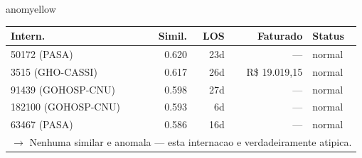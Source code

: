 \documentclass[a4paper,10pt]{article}
\begin{document}
\begin{anomalycard}[Internacao 124207 | GHO-PETROBRAS | MODERADO (z=2.03)]{anomyellow}
\begin{tabular}{l r r r l}\toprule\textbf{Intern.} & \textbf{Simil.} & \textbf{LOS} & \textbf{Faturado} & \textbf{Status} \\\midrule
50172 (PASA) & 0.620 & 23d & --- & \textcolor{jcubeblue}{normal} \\
3515 (GHO-CASSI) & 0.617 & 26d & R\$ 19.019,15 & \textcolor{jcubeblue}{normal} \\
91439 (GOHOSP-CNU) & 0.598 & 27d & --- & \textcolor{jcubeblue}{normal} \\
182100 (GOHOSP-CNU) & 0.593 & 6d & --- & \textcolor{jcubeblue}{normal} \\
63467 (PASA) & 0.586 & 16d & --- & \textcolor{jcubeblue}{normal} \\
\multicolumn{5}{l}{\textcolor{jcubeblue}{\small $\rightarrow$ Nenhuma similar e anomala --- esta internacao e verdadeiramente atipica.}} \\
\bottomrule\end{tabular}


\end{anomalycard}

\newpage
\end{document}
